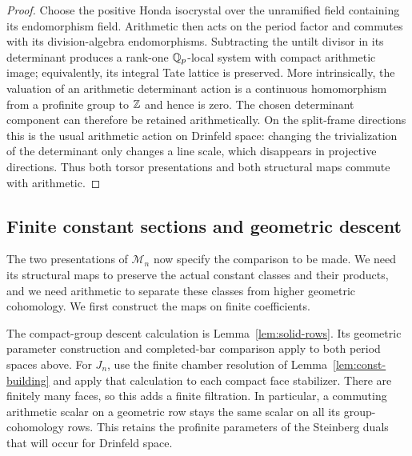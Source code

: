 \begin{proof}
Choose the positive Honda isocrystal over the unramified field containing
its endomorphism field.  Arithmetic then acts on the period factor and
commutes with its division-algebra endomorphisms.  Subtracting the untilt
divisor in its determinant produces a rank-one $\mathbb Q_p$-local system with
compact arithmetic image; equivalently, its integral Tate lattice is
preserved.  More intrinsically, the valuation of an arithmetic
determinant action is a continuous homomorphism from a profinite group
to $\mathbb Z$ and hence is zero.  The chosen determinant component can
therefore be retained arithmetically.  On the split-frame directions
this is the usual arithmetic action on Drinfeld space: changing the
trivialization of the determinant only changes a line scale, which
disappears in projective directions.  Thus both torsor presentations
and both structural maps commute with arithmetic.
\end{proof}

\subsection{Finite constant sections and geometric descent}

The two presentations of $\mathcal M_n$ now specify the comparison to
be made.  We need its structural maps to preserve the actual constant
classes and their products, and we need arithmetic to separate these
classes from higher geometric cohomology.  We first construct the
maps on finite coefficients.

The compact-group descent calculation is
Lemma~\ref{lem:solid-rows}.  Its geometric parameter construction and
completed-bar comparison apply to both period spaces above.  For
$J_n$, use the finite chamber resolution of
Lemma~\ref{lem:const-building} and apply that calculation to each
compact face stabilizer.  There are finitely many faces, so this adds
a finite filtration.  In particular, a commuting arithmetic scalar
on a geometric row stays the same scalar on all its group-cohomology
rows.  This retains the profinite parameters of the Steinberg duals
that will occur for Drinfeld space.

